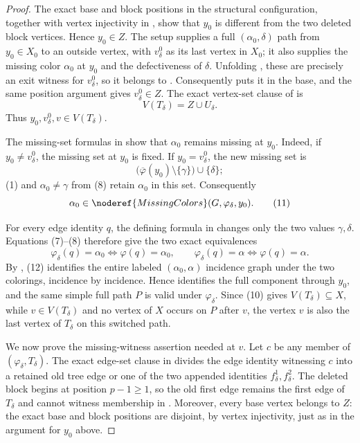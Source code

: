 \begin{proof}
The exact base and block positions in the structural configuration,
together with vertex injectivity in , show that
$y_0$ is different from the two deleted block vertices.  Hence
$y_0\in Z$.  The setup supplies a full
$(\alpha_0,\delta)$ path from $y_0\in X_0$ to an outside vertex, with
$v^0_\delta$ as its last vertex in $X_0$; it also supplies the missing
color $\alpha_0$ at $y_0$ and the defectiveness of $\delta$.  Unfolding
, these are precisely an exit witness for
$v^0_\delta$, so it belongs to .
Consequently  puts it in the base,
and the same position argument gives $v^0_\delta\in Z$.  The exact
vertex-set clause of  is
\[
 V(T_\delta)=Z\cup U_\delta.                                 \tag{10}
\]
Thus $y_0,v^0_\delta,v\in V(T_\delta)$.

The missing-set formulas in  show
that $\alpha_0$ remains missing at $y_0$.  Indeed, if
$y_0\ne v^0_\delta$, the missing set at $y_0$ is fixed.  If
$y_0=v^0_\delta$, the new missing set is
\[
 \bigl(\overline\varphi(y_0)\setminus\{\gamma\}\bigr)
       \cup\{\delta\};
\]
(1) and $\alpha_0\ne\gamma$ from (8) retain $\alpha_0$ in this set.
Consequently
\[
 \alpha_0\in\noderef{MissingColors}(G,\varphi_\delta,y_0).  \tag{11}
\]

For every edge identity $q$, the defining formula in
 changes only the two values
$\gamma,\delta$.  Equations (7)--(8) therefore give the two exact
equivalences
\[
 \varphi_\delta(q)=\alpha_0\iff\varphi(q)=\alpha_0,
 \qquad
 \varphi_\delta(q)=\alpha\iff\varphi(q)=\alpha.              \tag{12}
\]
By , (12) identifies the entire labeled
$(\alpha_0,\alpha)$ incidence graph under the two colorings, incidence by
incidence.  Hence  identifies the full
component through $y_0$, and the same simple full path $P$ is valid under
$\varphi_\delta$.  Since (10) gives $V(T_\delta)\subseteq X$, while
$v\in V(T_\delta)$ and no vertex of $X$ occurs on $P$ after $v$, the
vertex $v$ is also the last vertex of $T_\delta$ on this switched path.

We now prove the missing-witness assertion needed at $v$.  Let $c$ be any
member of $(\varphi_\delta,T_\delta)$.  The exact
edge-set clause in  divides the edge
identity witnessing $c$ into a retained old tree edge or one of the two
appended identities $f^1_\delta,f^2_\delta$.  The deleted block begins
at position $p-1\geq1$, so the old first edge remains the first edge of
$T_\delta$ and cannot witness membership in .
Moreover, every base vertex belongs to $Z$: the exact base and block
positions are disjoint, by vertex injectivity, just as in the argument
for $y_0$ above.


\end{proof}
